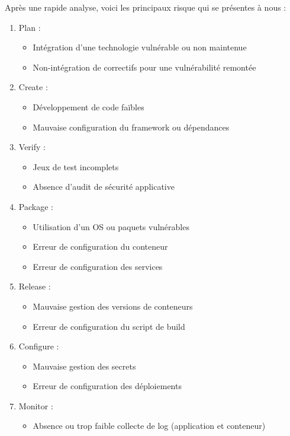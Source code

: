 Après une rapide analyse, voici les principaux risque qui se présentes à nous :
\begin{multicols}{2}
    \begin{enumerate}
        \item Plan :
        \begin{itemize}
            \item Intégration d'une technologie vulnérable ou non maintenue
            \item Non-intégration de correctifs pour une vulnérabilité remontée
        \end{itemize}
        \item Create :
        \begin{itemize}
            \item Développement de code faïbles
            \item Mauvaise configuration du framework ou dépendances
        \end{itemize}
        \item Verify :
        \begin{itemize}
            \item Jeux de test incomplets
            \item Absence d'audit de sécurité applicative
        \end{itemize}
        \item Package :
        \begin{itemize}
            \item Utilisation d'un OS ou paquets vulnérables
            \columnbreak
            \item Erreur de configuration du conteneur
            \item Erreur de configuration des services
        \end{itemize}
        \item Release :
        \begin{itemize}
            \item Mauvaise gestion des versions de conteneurs
            \item Erreur de configuration du script de build
        \end{itemize}
        \item Configure :
        \begin{itemize}
            \item Mauvaise gestion des secrets
            \item Erreur de configuration des déploiements
        \end{itemize}
        \item Monitor :
        \begin{itemize}
            \item Absence ou trop faible collecte de log (application et conteneur)
        \end{itemize}
    \end{enumerate}
\end{multicols}

